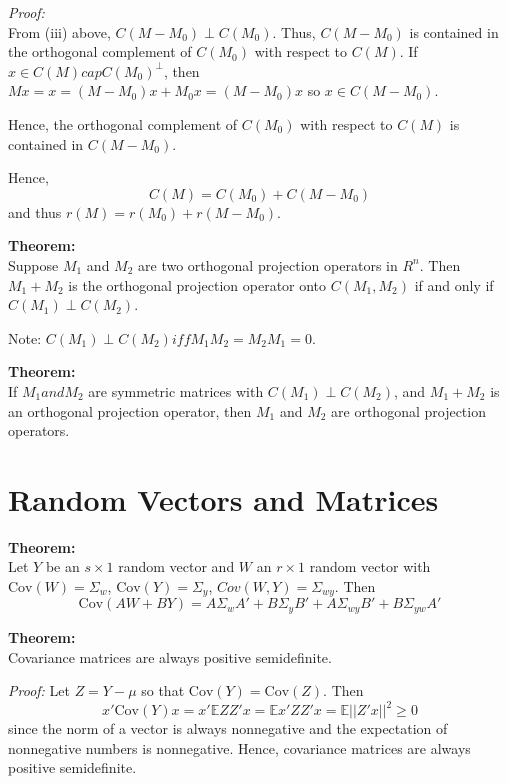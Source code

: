 \documentclass[12pt]{article}
\newcommand{\E}{\mathbb{E}}
\newcommand{\Cov}{\mathrm{Cov}}
\numberwithin{equation}{section}
\begin{document}
\textit{Proof:} \\
From (iii) above, $C(M - M_0) \perp C(M_0)$. Thus, $C(M - M_0)$ is contained in the orthogonal complement of $C(M_0)$ with respect to $C(M)$. If $x \in C(M) cap C(M_0)^{\perp}$, then \\
$Mx = x = (M - M_0)x + M_0 x = (M - M_0)x$ so $x \in C(M - M_0)$.

Hence, the orthogonal complement of $C(M_0)$ with respect to $C(M)$ is contained in $C(M - M_0)$.

Hence, 
\begin{equation*}
  C(M) = C(M_0) + C(M - M_0)
\end{equation*}
and thus $r(M) = r(M_0) + r(M - M_0)$.

\textbf{Theorem:} \\
Suppose $M_1$ and $M_2$ are two orthogonal projection operators in $R^n$. Then $M_1 + M_2$ is the orthogonal projection operator onto $C(M_1, M_2)$ if and only if $C(M_1) \perp C(M_2)$.

Note: $C(M_1) \perp C(M_2) iff M_1 M_2 = M_2 M_1 = 0$.

\textbf{Theorem:}\\
If $M_1 and M_2$ are symmetric matrices with $C(M_1) \perp C(M_2)$, and $M_1 + M_2$ is an orthogonal projection operator, then $M_1$ and $M_2$ are orthogonal projection operators. 

\section{Random Vectors and Matrices}
\textbf{Theorem:} \\
Let $Y$ be an $s \times 1$ random vector and $W$ an $r \times 1$ random vector with $\Cov(W) = \Sigma_w$, $\Cov(Y) = \Sigma_y$, $Cov(W, Y) = \Sigma_{wy}$. Then
\begin{equation*}
  \Cov(AW + BY) = A \Sigma_w A' + B \Sigma_y B' + A \Sigma_{wy} B' + B \Sigma_{yw} A'
\end{equation*}

\textbf{Theorem:} \\
Covariance matrices are always positive semidefinite.

\textit{Proof:}
Let $Z = Y - \mu$ so that $\Cov(Y) = \Cov(Z)$. Then
\begin{equation*}
  x'\Cov(Y) x = x' \E ZZ' x = \E x'ZZ'x = \E ||Z'x||^2 \ge 0
\end{equation*}
since the norm of a vector is always nonnegative and the expectation of nonnegative numbers is nonnegative. Hence, covariance matrices are always positive semidefinite.
\end{document}
